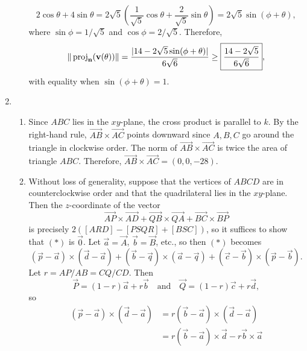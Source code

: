 \begin{enumerate}
\begin{enumerate}
\begin{equation*}
2\cos\theta + 4\sin\theta = 2\sqrt{5}\left(\frac{1}{\sqrt{5}}\cos\theta + \frac{2}{\sqrt{5}}\sin\theta\right) = 2\sqrt{5}\sin(\phi + \theta),
\end{equation*}
where $\sin\phi = 1/\sqrt{5}$ and $\cos\phi = 2/\sqrt{5}$. Therefore,
\begin{equation*}
\|\operatorname{proj}_{\mathbf{n}}(\mathbf{v}(\theta))\| = \frac{\lvert 14 - 2\sqrt{5}\sin(\phi + \theta)\rvert}{6\sqrt{6}}\geq\boxed{\frac{14 - 2\sqrt{5}}{6\sqrt{6}}},
\end{equation*}
with equality when $\sin(\phi + \theta) = 1$.
\end{enumerate}
\newpage
\item \begin{enumerate}
\item Since $ABC$ lies in the $xy$-plane, the cross product is parallel to $\unit{k}$. By the right-hand rule, $\overrightarrow{AB}\times\overrightarrow{AC}$ points downward since $A,B,C$ go around the triangle in clockwise order. The norm of $\overrightarrow{AB}\times\overrightarrow{AC}$ is twice the area of triangle $ABC$. Therefore, $\overrightarrow{AB}\times\overrightarrow{AC} = (0, 0, -28)$.
\item Without loss of generality, suppose that the vertices of $ABCD$ are in counterclockwise order and that the quadrilateral lies in the $xy$-plane. Then the $z$-coordinate of the vector
\begin{equation*}
\overrightarrow{AP}\times\overrightarrow{AD} + \overrightarrow{QB}\times\overrightarrow{QA} + \overrightarrow{BC}\times\overrightarrow{BP} \tag{$*$}
\end{equation*}
is precisely $2([ARD] - [PSQR] + [BSC])$, so it suffices to show that $(*)$ is $\vec{0}$. Let $\vec{a} = \overrightarrow{A}$, $\vec{b} = \overrightarrow{B}$, etc., so then $(*)$ becomes
\begin{equation*}
(\vec{p} - \vec{a})\times (\vec{d} - \vec{a}) + (\vec{b} - \vec{q})\times (\vec{a} - \vec{q}) + (\vec{c} - \vec{b})\times (\vec{p} - \vec{b}).
\end{equation*}
Let $r = AP/AB = CQ/CD$. Then
\begin{equation*}
\overrightarrow{P} = (1 - r)\vec{a} + r\vec{b}\quad\text{and}\quad\overrightarrow{Q} = (1 - r)\vec{c} + r\vec{d},
\end{equation*}
so
\begin{align*}
(\vec{p} - \vec{a})\times (\vec{d} - \vec{a}) &= r(\vec{b} - \vec{a})\times (\vec{d} - \vec{a}) \\
&= r(\vec{b} - \vec{a})\times\vec{d} - r\vec{b}\times\vec{a} \\

\end{align*}
\end{enumerate}
\end{enumerate}
